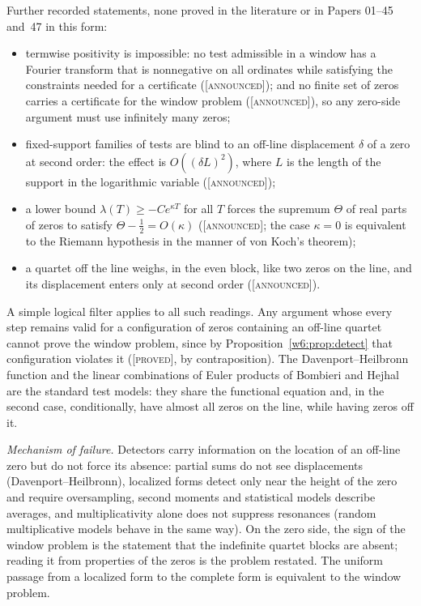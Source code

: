 \documentclass[11pt]{amsart}
\theoremstyle{definition}
\theoremstyle{remark}
\numberwithin{equation}{section}
\newcommand{\lam}{\lambda(T)}                          %
\newcommand{\stag}[1]{\textsc{[#1]}}
\newcommand{\PROVED}{\stag{proved}}
\newcommand{\ANNOUNCED}{\stag{announced}}
\newcommand{\entry}[1]{\par\smallskip\noindent\textit{#1.}\enspace}
\begin{document}
Further recorded statements, none proved in the literature or in Papers 01--45 and~47 in this form:
\begin{itemize}[leftmargin=2em]
\item termwise positivity is impossible: no test admissible in a window has a Fourier transform that
  is nonnegative on all ordinates while satisfying the constraints needed for a certificate
  (\ANNOUNCED); and no finite set of zeros carries a certificate for the window problem
  (\ANNOUNCED), so any zero-side argument must use infinitely many zeros;
\item fixed-support families of tests are blind to an off-line displacement $\delta$ of a zero at
  second order: the effect is $O((\delta L)^2)$, where $L$ is the length of the support in the
  logarithmic variable (\ANNOUNCED);
\item a lower bound $\lam\ge-Ce^{\kappa T}$ for all $T$ forces the supremum $\Theta$ of real parts of
  zeros to satisfy $\Theta-\frac12=O(\kappa)$ (\ANNOUNCED; the case $\kappa=0$ is equivalent to the
  Riemann hypothesis in the manner of von Koch's theorem);
\item a quartet off the line weighs, in the even block, like two zeros on the line, and its
  displacement enters only at second order (\ANNOUNCED).
\end{itemize}
A simple logical filter applies to all such readings. Any argument whose every step remains valid for
a configuration of zeros containing an off-line quartet cannot prove the window problem, since by
Proposition~\ref{w6:prop:detect} that configuration violates it (\PROVED, by contraposition). The
Davenport--Heilbronn function and the linear combinations of Euler products of Bombieri and Hejhal
\cite{BombieriHejhal1995} are the standard test models: they share the functional equation and,
in the second case, conditionally, have almost all zeros on the line, while having zeros off it.

\entry{Mechanism of failure} Detectors carry information on the location of an off-line zero but do
not force its absence: partial sums do not see displacements (Davenport--Heilbronn), localized forms
detect only near the height of the zero and require oversampling, second moments and statistical
models describe averages, and multiplicativity alone does not suppress resonances (random
multiplicative models behave in the same way). On the zero side, the sign of the window problem is
the statement that the indefinite quartet blocks are absent; reading it from properties of the zeros
is the problem restated. The uniform passage from a localized form to the complete form is
equivalent to the window problem.
\end{document}
